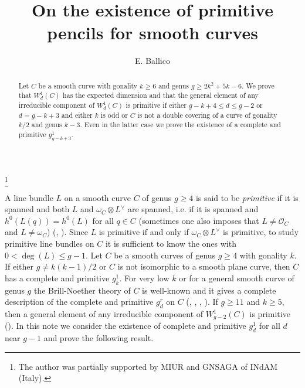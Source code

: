 \documentclass{amsart}
\theoremstyle{plain}
\theoremstyle{definition}
\begin{document}
\title[primitive linear series]
{On the existence of primitive pencils for smooth curves}
\author{E. Ballico}
\address{Dept. of Mathematics\\
 University of Trento\\
38123 Povo (TN), Italy}
\thanks{The author was partially supported by MIUR and GNSAGA of INdAM (Italy).}

\begin{abstract}
Let $C$ be a smooth curve with gonality $k\ge 6$ and genus $g\ge 2k^2+5k-6$. We prove that $W^1_d({C})$ has the expected dimension
and that the general element of any irreducible component of $W^1_d({C})$ is primitive if either $g-k+4\le d\le g-2$ or $d=g-k+3$
and either $k$ is odd or $C$ is not a double covering of a curve of gonality $k/2$ and genus $k-3$. Even in the latter case we prove the existence of a complete and primitive
$g^1_{g-k+3}$.
\end{abstract}


\maketitle

A line bundle $L$ on a smooth curve $C$ of genus $g\ge 4$ is said to be {\emph{primitive}} if it is spanned and both $L$ and $\omega _C\otimes L^\vee$ are spanned,
i.e. if it is spanned and $h^0(L(q)) =h^0(L)$ for all $q\in C$ (sometimes one also imposes that $L\ne \mathcal {O} _C$ and $L\ne \omega _C$) (\cite{ckm}, \cite{ckm1}). Since $L$ is primitive
if and only if $\omega _C\otimes L^\vee$ is primitive, to study primitive line bundles on $C$ it is sufficient to know the ones with $0 < \deg (L) \le g-1$.
Let $C$ be a smooth curves of genus $g\ge 4$ with gonality $k$. If either $g\ne k(k-1)/2$ or $C$ is not isomorphic to a smooth plane curve, then
$C$ has a complete and primitive $g^1_k$. For very low $k$ or for a general smooth curve of genus $g$ the Brill-Noether theory of $C$ is well-known and it gives a complete description
of the complete and primitive $g^r_d$ on $C$ (\cite{ckm}, \cite{ckm1}, \cite{ckm2}, \cite{cm}). If $g\ge 11$ and $k\ge 5$, then a general element of any irreducible component of $W^1_{g-2}({C})$ is primitive
(\cite[Proposition II.0]{v}). In this note we consider the existence of complete and primitive $g^1_d$ for all $d$ near $g-1$ and prove the following result.
\end{document}
